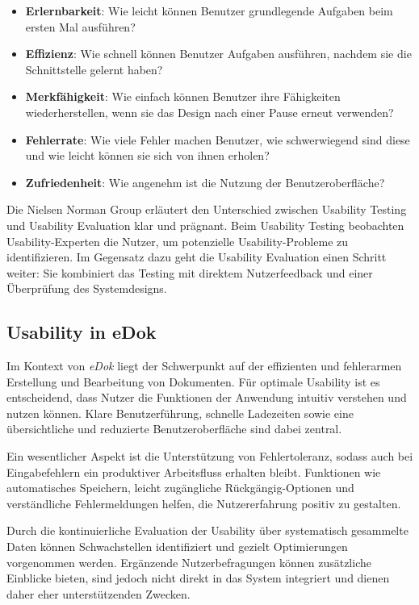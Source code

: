 \documentclass[12pt,oneside]{article}
\begin{document}
\begin{itemize} \item \textbf{Erlernbarkeit}: Wie leicht können Benutzer grundlegende Aufgaben beim ersten Mal ausführen? \item \textbf{Effizienz}: Wie schnell können Benutzer Aufgaben ausführen, nachdem sie die Schnittstelle gelernt haben? \item \textbf{Merkfähigkeit}: Wie einfach können Benutzer ihre Fähigkeiten wiederherstellen, wenn sie das Design nach einer Pause erneut verwenden? \item \textbf{Fehlerrate}: Wie viele Fehler machen Benutzer, wie schwerwiegend sind diese und wie leicht können sie sich von ihnen erholen? \item \textbf{Zufriedenheit}: Wie angenehm ist die Nutzung der Benutzeroberfläche? \end{itemize}
Die Nielsen Norman Group erläutert den Unterschied zwischen Usability Testing und Usability Evaluation klar und prägnant. Beim Usability Testing beobachten Usability-Experten die Nutzer, um potenzielle Usability-Probleme zu identifizieren. Im Gegensatz dazu geht die Usability Evaluation einen Schritt weiter: Sie kombiniert das Testing mit direktem Nutzerfeedback und einer Überprüfung des Systemdesigns.
\subsection{Usability in eDok}

Im Kontext von \textit{eDok} liegt der Schwerpunkt auf der effizienten und fehlerarmen Erstellung und Bearbeitung von Dokumenten. Für optimale Usability ist es entscheidend, dass Nutzer die Funktionen der Anwendung intuitiv verstehen und nutzen können. Klare Benutzerführung, schnelle Ladezeiten sowie eine übersichtliche und reduzierte Benutzeroberfläche sind dabei zentral.

Ein wesentlicher Aspekt ist die Unterstützung von Fehlertoleranz, sodass auch bei Eingabefehlern ein produktiver Arbeitsfluss erhalten bleibt. Funktionen wie automatisches Speichern, leicht zugängliche Rückgängig-Optionen und verständliche Fehlermeldungen helfen, die Nutzererfahrung positiv zu gestalten.

Durch die kontinuierliche Evaluation der Usability über systematisch gesammelte Daten können Schwachstellen identifiziert und gezielt Optimierungen vorgenommen werden. Ergänzende Nutzerbefragungen können zusätzliche Einblicke bieten, sind jedoch nicht direkt in das System integriert und dienen daher eher unterstützenden Zwecken.
\end{document}
